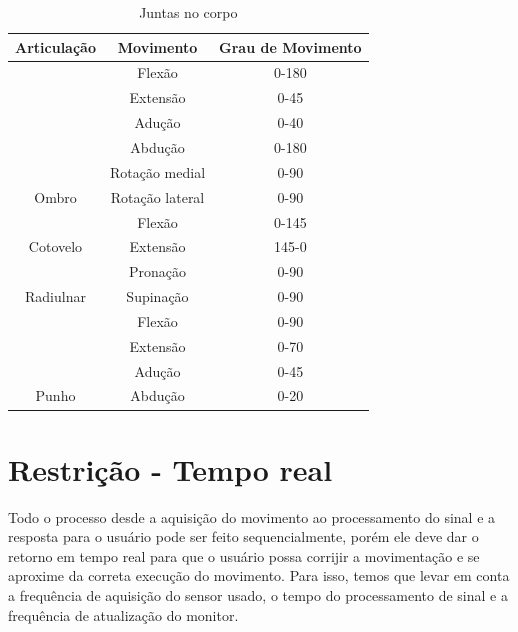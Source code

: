 \begin{table}[]
\centering
\caption{Juntas no corpo}
\label{Juntas no corpo}
\begin{tabular}{|c|c|c|}
\hline
\rowcolor[HTML]{C0C0C0} 
Articulação                 & Movimento       & Grau de  Movimento \\ \hline
                            & Flexão          & 0-180              \\ \cline{2-3} 
                            & Extensão        & 0-45               \\ \cline{2-3} 
                            & Adução          & 0-40               \\ \cline{2-3} 
                            & Abdução         & 0-180              \\ \cline{2-3} 
                            & Rotação medial  & 0-90               \\ \cline{2-3} 
\multirow{-6}{*}{Ombro}     & Rotação lateral & 0-90               \\ \hline
                            & Flexão          & 0-145              \\ \cline{2-3} 
\multirow{-2}{*}{Cotovelo}  & Extensão        & 145-0              \\ \hline
                            & Pronação        & 0-90               \\ \cline{2-3} 
\multirow{-2}{*}{Radiulnar} & Supinação       & 0-90               \\ \hline
                            & Flexão          & 0-90               \\ \cline{2-3} 
                            & Extensão        & 0-70               \\ \cline{2-3} 
                            & Adução          & 0-45               \\ \cline{2-3} 
\multirow{-4}{*}{Punho}     & Abdução         & 0-20               \\ \hline
\end{tabular}
\end{table}

\section{Restrição - Tempo real}
\label{Sec:restrição}
  Todo o processo desde a aquisição do movimento ao processamento do sinal e a 
resposta para o usuário pode ser feito sequencialmente, porém ele deve dar o 
retorno em tempo real para que o usuário possa corrijir a movimentação e se 
aproxime da correta execução do movimento. Para isso, temos que levar em conta 
a frequência de aquisição do sensor usado, o tempo do processamento de sinal e 
a frequência de atualização do monitor.

